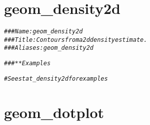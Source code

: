 \documentclass[a4paper,titlepage]{tufte-handout}\usepackage[]{graphicx}\usepackage[]{color}
\makeatletter
\newcommand{\hlcom}[1]{\textcolor[rgb]{0.678,0.584,0.686}{\textit{#1}}}%
\newenvironment{kframe}{%
 \def\at@end@of@kframe{}%
 \ifinner\ifhmode%
  \def\at@end@of@kframe{\end{minipage}}%
  \begin{minipage}{\columnwidth}%
 \fi\fi%
 \def\FrameCommand##1{\hskip\@totalleftmargin \hskip-\fboxsep
 \colorbox{shadecolor}{##1}\hskip-\fboxsep
     \hskip-\linewidth \hskip-\@totalleftmargin \hskip\columnwidth}%
 \MakeFramed {\advance\hsize-\width
   \@totalleftmargin\z@ \linewidth\hsize
   \@setminipage}}%
 {\par\unskip\endMakeFramed%
 \at@end@of@kframe}
\newenvironment{knitrout}{}{} %
\makeatother
\begin{document}
\section{geom\_density2d}

\begin{knitrout}
\color{fgcolor}\begin{kframe}
\begin{alltt}
\hlcom{### Name: geom_density2d}
\hlcom{### Title: Contours from a 2d density estimate.}
\hlcom{### Aliases: geom_density2d}

\hlcom{### ** Examples}

\hlcom{# See stat_density2d for examples}
\end{alltt}
\end{kframe}
\end{knitrout}



\section{geom\_dotplot}
\end{document}
